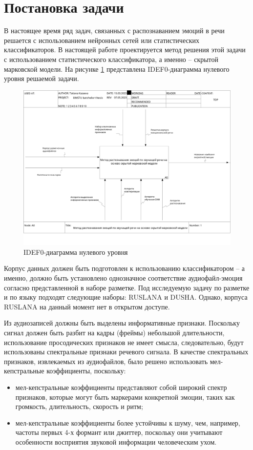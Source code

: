 \section{Постановка задачи}
В настоящее время ряд задач, связанных с распознаванием эмоций в речи решается с использованием нейронных сетей или статистических классификаторов. В настоящей работе проектируется метод решения этой задачи с использованием статистического классификатора, а именно -- скрытой марковской модели. На рисунке \ref{fig:idef0} представлена IDEF0-диаграмма нулевого уровня решаемой задачи.
\begin{figure}[H]
	\centering
	\includegraphics[width=\linewidth]{assets/01_A0}
	\caption{IDEF0-диаграмма нулевого уровня}
	\label{fig:idef0}
\end{figure}
Корпус данных должен быть подготовлен к использованию классификатором -- а именно, должно быть установлено однозначное соответствие аудиофайл-эмоция согласно представленной в наборе разметке. Под исследуемую задачу по разметке и по языку подходят следующие наборы: RUSLANA и DUSHA. Однако, корпуса RUSLANA на данный момент нет в открытом доступе.

Из аудиозаписей должны быть выделены информативные признаки. Поскольку сигнал должен быть разбит на кадры (фреймы) небольшой длительности, использование просодических признаков не имеет смысла, следовательно, будут использованы спектральные признаки речевого сигнала. В качестве спектральных признаков, извлекаемых из аудиофайлов, было решено использовать мел-кепстральные коэффициенты, поскольку:
\begin{itemize}
	\item мел-кепстральные коэффициенты представляют собой широкий спектр признаков, которые могут быть маркерами конкретной эмоции, таких как громкость, длительность, скорость и ритм;
	\item мел-кепстральные коэффициенты более устойчивы к шуму, чем, например, частоты первых 4-х формант или джиттер, поскольку они учитывают особенности восприятия звуковой информации человеческим ухом.
\end{itemize}

